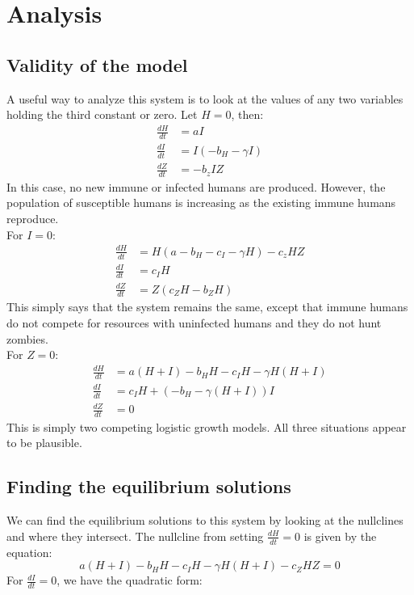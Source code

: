 \documentclass[
	12pt
]{article}
\begin{document}
\section{Analysis}
		\subsection{Validity of the model}
			A useful way to analyze this system is to look at the values of any two variables holding the third constant or zero.
			Let $H= 0$, then:
			\begin{align*}
				\frac{dH}{dt} &=aI\\
				\frac{dI}{dt} &= I(-b_H-\gamma I)\\
				\frac{dZ}{dt} &= -b_z IZ
			\end{align*}
			In this case, no new immune or infected humans are produced. However, the population of susceptible humans is increasing as the existing immune humans reproduce. \\
			For $I=0$:
			\begin{align*}
				\frac{dH}{dt} &= H(a-b_H-c_I-\gamma H)-c_z HZ\\
				\frac{dI}{dt} &= c_IH\\
				\frac{dZ}{dt} &= Z(c_ZH-b_ZH)
			\end{align*}	
			This simply says that the system remains the same, except that immune humans do not compete for resources with uninfected humans and they do not hunt zombies.\\
			For $Z=0$:
			\begin{align*}
				\frac{dH}{dt} &= a(H+I)-b_HH-c_IH-\gamma H(H+I)\\
				\frac{dI}{dt} &= c_IH+(-b_H-\gamma(H+I))I \\
				\frac{dZ}{dt} &= 0
			\end{align*}
			This is simply two competing logistic growth models. All three situations appear to be plausible.
		\subsection{Finding the equilibrium solutions}
We can find the equilibrium solutions to this system by looking at the nullclines and where they intersect. The nullcline from setting $\frac{dH}{dt}=0$ is given by the equation:
\begin{equation}
a(H+I)-b_HH-c_IH-\gamma H(H+I)-c_ZHZ=0
\end{equation}
For $\frac{dI}{dt}=0$, we have the quadratic form:
\end{document}
